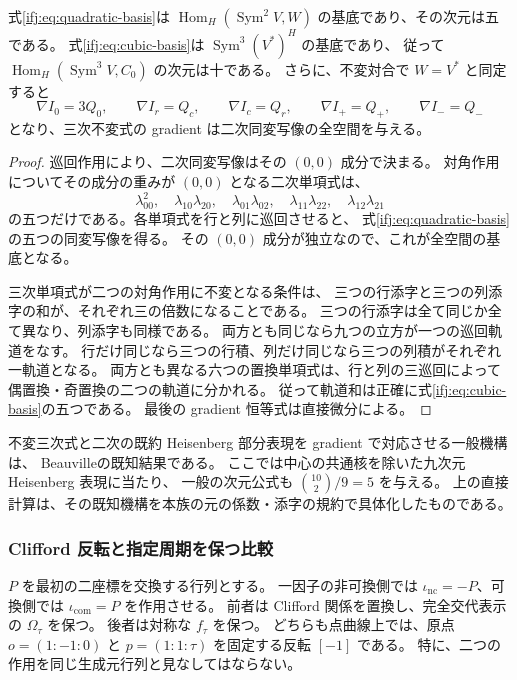 \begin{proposition}
\label{ifj:prop:heisenberg-bases}
式\eqref{ifj:eq:quadratic-basis}は
$\operatorname{Hom}_H(\operatorname{Sym}^2V,W)$ の基底であり、その次元は五である。
式\eqref{ifj:eq:cubic-basis}は $\operatorname{Sym}^3(V^*)^H$ の基底であり、
従って $\operatorname{Hom}_H(\operatorname{Sym}^3V,C_0)$ の次元は十である。
さらに、不変対合で $W=V^*$ と同定すると
\[
 \nabla I_0=3Q_0,\qquad \nabla I_r=Q_c,\qquad
 \nabla I_c=Q_r,\qquad \nabla I_+=Q_+,\qquad \nabla I_-=Q_-
\]
となり、三次不変式の gradient は二次同変写像の全空間を与える。
\end{proposition}

\begin{proof}
巡回作用により、二次同変写像はその $(0,0)$ 成分で決まる。
対角作用についてその成分の重みが $(0,0)$ となる二次単項式は、
\[
 \lambda_{00}^2,\quad\lambda_{10}\lambda_{20},\quad
 \lambda_{01}\lambda_{02},\quad\lambda_{11}\lambda_{22},\quad
 \lambda_{12}\lambda_{21}
\]
の五つだけである。各単項式を行と列に巡回させると、
式\eqref{ifj:eq:quadratic-basis}の五つの同変写像を得る。
その $(0,0)$ 成分が独立なので、これが全空間の基底となる。

三次単項式が二つの対角作用に不変となる条件は、
三つの行添字と三つの列添字の和が、それぞれ三の倍数になることである。
三つの行添字は全て同じか全て異なり、列添字も同様である。
両方とも同じなら九つの立方が一つの巡回軌道をなす。
行だけ同じなら三つの行積、列だけ同じなら三つの列積がそれぞれ一軌道となる。
両方とも異なる六つの置換単項式は、行と列の三巡回によって
偶置換・奇置換の二つの軌道に分かれる。
従って軌道和は正確に式\eqref{ifj:eq:cubic-basis}の五つである。
最後の gradient 恒等式は直接微分による。
\end{proof}

不変三次式と二次の既約 Heisenberg 部分表現を gradient で対応させる一般機構は、
Beauville\cite[Section~1, Proposition~1]{IFJBeauvilleCoble}の既知結果である。
ここでは中心の共通核を除いた九次元 Heisenberg 表現に当たり、
一般の次元公式も $\binom{10}{2}/9=5$ を与える。
上の直接計算は、その既知機構を本族の元の係数・添字の規約で具体化したものである。

\subsubsection{Clifford 反転と指定周期を保つ比較}

$P$ を最初の二座標を交換する行列とする。
一因子の非可換側では $\iota_{\mathrm{nc}}=-P$、可換側では
$\iota_{\mathrm{com}}=P$ を作用させる。
前者は Clifford 関係を置換し、完全交代表示の $\Omega_\tau$ を保つ。
後者は対称な $f_\tau$ を保つ。
どちらも点曲線上では、原点 $o=(1:-1:0)$ と
$p=(1:1:\tau)$ を固定する反転 $[-1]$ である。
特に、二つの作用を同じ生成元行列と見なしてはならない。

